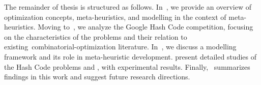 The remainder of thesis is structured as follows. In~, we
provide an overview of optimization concepts, meta-heuristics, and modelling in
the context of meta-heuristics. Moving to~, we
analyze the Google Hash Code competition, focusing on the characteristics of the
problems and their relation to existing~\acrshort{combinatorial-optimization}
literature. In~, we discuss a modelling
framework and its role in meta-heuristic development.
 present detailed studies of the
Hash Code problems  and ,
with experimental results. Finally,~ summarizes findings in
this work and suggest future research directions.